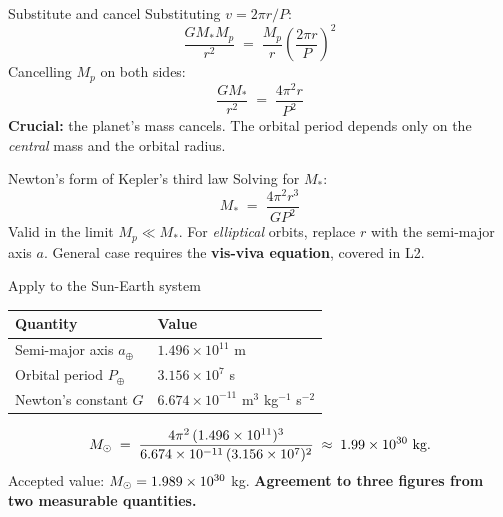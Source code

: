 \documentclass[aspectratio=169, 11pt]{beamer}
\begin{document}
\begin{frame}{Substitute and cancel}
  Substituting $v = 2\pi r / P$:
  \[
    \frac{G M_* M_p}{r^2} \;=\; \frac{M_p}{r}\left(\frac{2 \pi r}{P}\right)^{\!2}
  \]
  Cancelling $M_p$ on both sides:
  \[
    \frac{G M_*}{r^2} \;=\; \frac{4 \pi^2 r}{P^2}
  \]
  \vskip4pt\relax
  \textbf{Crucial:} the planet's mass cancels. The orbital period depends only on the \emph{central} mass and the orbital radius.
\end{frame}

\begin{frame}{Newton's form of Kepler's third law}
  Solving for $M_*$:
  \vskip8pt\relax
  \[
    \boxed{\; M_* \;=\; \frac{4 \pi^2 r^3}{G P^2} \;}
  \]
  \vskip8pt\relax
  Valid in the limit $M_p \ll M_*$.
  \vskip6pt\relax
  For \emph{elliptical} orbits, replace $r$ with the semi-major axis $a$. General case requires the \textbf{vis-viva equation}, covered in L2.
\end{frame}

\begin{frame}{Apply to the Sun-Earth system}
  \centering
  \footnotesize
  \begin{tabular}{ll}
    \toprule
    Quantity & Value \\
    \midrule
    Semi-major axis $a_\oplus$ & $1.496 \times 10^{11}$ m \\
    Orbital period $P_\oplus$  & $3.156 \times 10^{7}$ s \\
    Newton's constant $G$      & $6.674 \times 10^{-11}$ m$^3$ kg$^{-1}$ s$^{-2}$ \\
    \bottomrule
  \end{tabular}
  \vskip8pt\relax
  \normalsize
  \[
    M_{\odot}
    \;=\; \frac{4 \pi^2 \,(1.496 \times 10^{11})^{3}}
                {6.674 \times 10^{-11}\,(3.156 \times 10^{7})^{2}}
    \;\approx\; 1.99 \times 10^{30}\ \text{kg}.
  \]
  \vskip6pt\relax
  Accepted value: $M_{\odot} = 1.989 \times 10^{30}$ kg. \textbf{Agreement to three figures from two measurable quantities.}
\end{frame}
\end{document}
